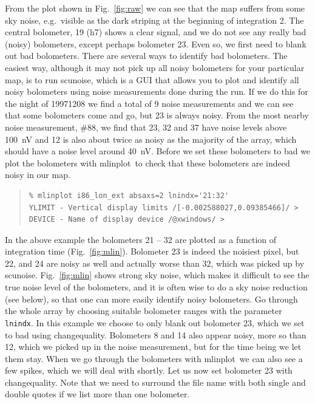 \documentclass[twoside,11pt]{article}
\newenvironment{myquote}{\begin{quote}\begin{small}}{\end{small}\end{quote}}
\newcommand{\task}[1]{\textsf{#1}}
\newcommand{\chgqual}{\xref{\task{change\_\-qua\-lity}}{sun216}{CHANGE_QUALITY}}
\newcommand{\scunoise}{\xref{\task{scunoise}}{sun216}{SCUNOISE}}
\newcommand{\mlinplot}{\xref{\task{mlinplot}}{sun95}{MLINPLOT}}
\newcommand{\xref}[3]{#1}
\renewcommand{\_}{\texttt{\symbol{95}}}
\begin{document}
From the plot shown in Fig.\ \ref{fig:raw} we can see that the map
suffers from some sky noise, e.g.\ visible as the dark striping at the
beginning of integration 2.  The central bolometer, 19 (h7) shows a
clear signal, and we do not see any really bad (noisy) bolometers,
except perhaps bolometer 23.  Even so, we first need to blank out bad
bolometers.  There are several ways to identify bad bolometers.  The
easiest way, although it may not pick up all noisy bolometers for your
particular map, is to run \scunoise, which is a GUI that allows you to
plot and identify all noisy bolometers using noise measurements done
during the run.  If we do this for the night of 19971208 we find a
total of 9 noise measurements and we can see that some bolometers come
and go, but 23 is always noisy.  From the most nearby noise
measurement, \#88, we find that 23, 32 and 37 have noise levels above
100~nV and 12 is also about twice as noisy as the majority of the
array, which should have a noise level around 40~nV. Before we set
these bolometers to bad we plot the bolometers with \mlinplot\ to
check that these bolometers are indeed noisy in our map.


\begin{myquote}
\begin{verbatim}
% mlinplot i86_lon_ext absaxs=2 lnindx='21:32'
YLIMIT - Vertical display limits /[-0.002588027,0.09385466]/ >
DEVICE - Name of display device /@xwindows/ >
\end{verbatim}
\end{myquote}

In the above example the bolometers 21 -- 32 are plotted as a function
of integration time (Fig.\  \ref{fig:mlin}).  Bolometer 23 is indeed the
noisiest pixel, but 22, and 24 are noisy as well and actually worse
than 32, which was picked up by \scunoise.  Fig.\  \ref{fig:mlin} shows
strong sky noise, which makes it difficult to see the true noise level
of the bolometers, and it is often wise to do a sky noise reduction
(see below), so that one can more easily identify noisy bolometers.
Go through the whole array by choosing suitable bolometer ranges with
the parameter \texttt{lnindx}.  In this example we choose to only
blank out bolometer 23, which we set to bad using \chgqual.
Bolometers 8 and 14 also appear noisy, more so than 12, which we
picked up in the noise measurement, but for the time being we let them
stay.  When we go through the bolometers with \mlinplot\ we can also
see a few spikes, which we will deal with shortly.  Let us now set
bolometer 23 with \chgqual.  Note that we need to surround the file
name with both single and double quotes if we list more than one
bolometer.
\end{document}
